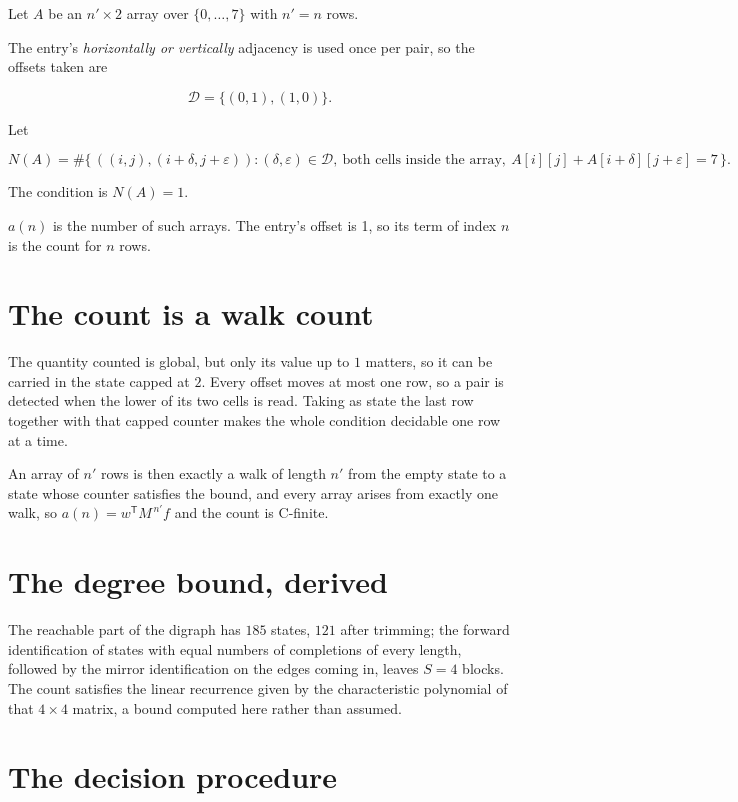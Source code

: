\documentclass[11pt]{article}
\theoremstyle{definition}
\begin{document}
Let $A$ be an $n' \times 2$ array over $\{0,\dots,7\}$ with $n' = n$ rows.

The entry's {\itshape horizontally or vertically} adjacency is used once per pair, so the offsets taken are

\[\mathcal{D} = \{(0,1), (1,0)\}.\]

Let

\[N(A) = \#\bigl\{\,((i,j),(i{+}\delta,j{+}\varepsilon)) : (\delta,\varepsilon) \in \mathcal{D},\ \text{both cells inside the array},\ A[i][j] + A[i{+}\delta][j{+}\varepsilon] = 7\,\bigr\}.\]

The condition is $N(A) = 1$.

$a(n)$ is the number of such arrays. The entry's offset is 1, so its term of index $n$ is the count for $n$ rows.

\section{The count is a walk count}

The quantity counted is global, but only its value up to $1$ matters, so it can be carried in the state capped at $2$. Every offset moves at most one row, so a pair is detected when the lower of its two cells is read. Taking as state the last row together with that capped counter makes the whole condition decidable one row at a time.

An array of $n'$ rows is then exactly a walk of length $n'$ from the empty state to a state whose counter satisfies the bound, and every array arises from exactly one walk, so $a(n) = w^{\mathsf T}M^{\,n'}f$ and the count is C-finite.

\section{The degree bound, derived}

The reachable part of the digraph has $185$ states, $121$ after trimming; the forward identification of states with equal numbers of completions of every length, followed by the mirror identification on the edges coming in, leaves $S = 4$ blocks. The count satisfies the linear recurrence given by the characteristic polynomial of that $4\times4$ matrix, a bound computed here rather than assumed.

\section{The decision procedure}
\end{document}
